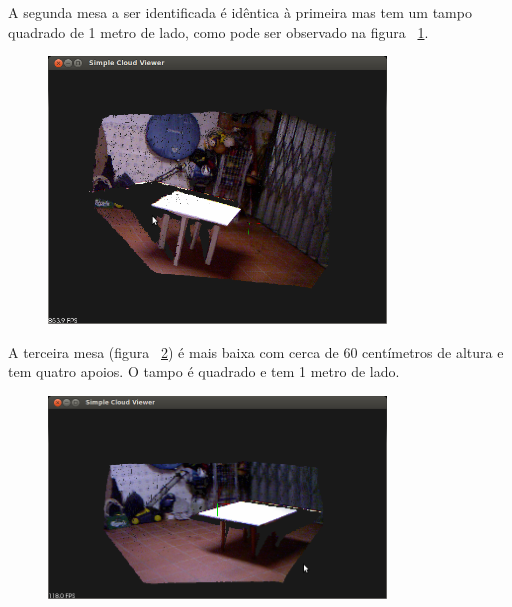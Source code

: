 A segunda mesa a ser identificada é idêntica à primeira mas tem um tampo quadrado de 1 metro de lado, como pode ser observado na figura ~\ref{fig:mesa2}.

\begin{figure}[htb]
\begin{center}
	\includegraphics[width=0.80\textwidth]{figures/mesa2.png}
	\label{fig:mesa2}
\end{center}
\end{figure}

A terceira mesa (figura ~\ref{fig:mesa3}) é mais baixa com cerca de 60 centímetros de altura e tem quatro apoios. O tampo é quadrado e tem 1 metro de lado.

\begin{figure}[htb]
\begin{center}
	\includegraphics[width=0.80\textwidth]{figures/mesa3.png}
	\label{fig:mesa3}
\end{center}
\end{figure}

